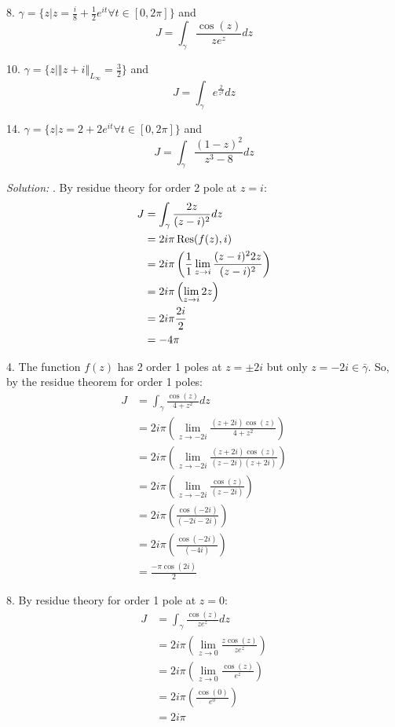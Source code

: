 \documentclass[11pt]{homework}
\begin{document}
8. $\gamma = \{z | z=\frac{i}{8}+\frac{1}{2}e^{it} \forall t\in[0,2\pi]\}$ and
\begin{equation*}
J = \int_\gamma \frac{\cos(z)}{ze^z} dz
\end{equation*}

10.  $\gamma = \{z |  \left\Vert z+i \right\Vert_{L_\infty}=\frac{3}{2} \}$ and
\begin{equation*}
J = \int_\gamma e^{\frac{2}{z^2}} dz
\end{equation*}

14.  $\gamma = \{z | z=2+2e^{it} \forall t\in[0,2\pi]\}$ and
\begin{equation*}
J = \int_\gamma \frac{(1-z)^2}{z^3-8} dz
\end{equation*}

\emph{Solution:}
. By residue theory for order 2 pole at $z=i$:
\begin{align*}
J &=  \int_\gamma \frac{2z}{(z-i)^2} dz \\
  &= 2i\pi \Res(f(z), i) \\
  &= 2i\pi \left( \frac{1}{1}\lim_{z\to i} \frac{(z-i)^2 2z}{(z-i)^2}  \right) \\
  &= 2i\pi \left( \lim_{z\to i} 2z \right) \\
  &= 2i\pi \frac{2i}{2} \\
  &= -4\pi
\end{align*}

4. The function $f(z)$ has 2 order 1 poles at $z=\pm2i$ but 
only $z=-2i \in \bar{\gamma}$. 
So, by the residue theorem for order 1 poles:
\begin{align*}
J &= \int_\gamma \frac{\cos(z)}{4+z^2} dz \\
  &= 2i\pi \left( \lim_{z\to -2i} \frac{(z+2i)\cos(z)}{4+z^2} \right) \\
  &= 2i\pi \left( \lim_{z\to -2i} \frac{(z+2i)\cos(z)}{(z-2i)(z+2i)} \right) \\
  &= 2i\pi \left( \lim_{z\to -2i} \frac{\cos(z)}{(z-2i)} \right) \\
  &= 2i\pi \left( \frac{\cos(-2i)}{(-2i-2i)} \right) \\
  &= 2i\pi \left( \frac{\cos(-2i)}{(-4i)} \right) \\
  &= \frac{-\pi \cos(2i)}{2}
\end{align*}

8. By residue theory for order 1 pole at $z=0$:
\begin{align*}
J &= \int_\gamma \frac{\cos(z)}{ze^z} dz \\
  &= 2 i \pi \left(\lim_{z\to 0} \frac{z\cos(z)}{ze^z} \right) \\
  &= 2 i \pi \left(\lim_{z\to 0} \frac{\cos(z)}{e^z} \right) \\
  &= 2 i \pi \left(\frac{\cos(0)}{e^0} \right) \\
  &= 2 i \pi 
\end{align*}
\end{document}
